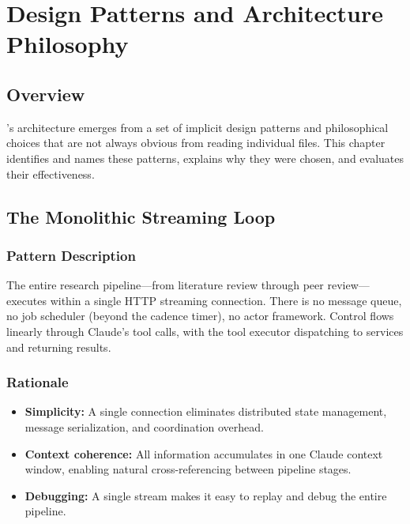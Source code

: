 \chapter{Design Patterns and Architecture Philosophy}
\label{ch:design-patterns}

\section{Overview}
\label{sec:patterns:overview}

\autoscholar's architecture emerges from a set of implicit design patterns and philosophical choices that are not always obvious from reading individual files.
This chapter identifies and names these patterns, explains why they were chosen, and evaluates their effectiveness.

\section{The Monolithic Streaming Loop}
\label{sec:patterns:streaming-loop}

\subsection{Pattern Description}

The entire research pipeline---from literature review through peer review---executes within a single HTTP streaming connection.
There is no message queue, no job scheduler (beyond the cadence timer), no actor framework.
Control flows linearly through Claude's tool calls, with the tool executor dispatching to services and returning results.

\subsection{Rationale}

\begin{itemize}
  \item \textbf{Simplicity:} A single connection eliminates distributed state management, message serialization, and coordination overhead.
  \item \textbf{Context coherence:} All information accumulates in one Claude context window, enabling natural cross-referencing between pipeline stages.
  \item \textbf{Debugging:} A single stream makes it easy to replay and debug the entire pipeline.
\end{itemize}

